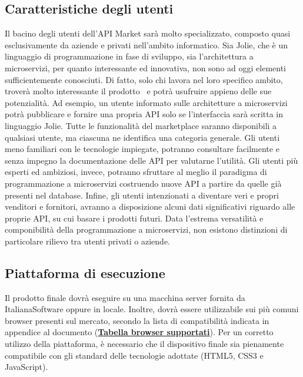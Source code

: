 \subsection{Caratteristiche degli utenti}
Il bacino degli utenti dell'API Market sarà molto specializzato, composto quasi esclusivamente da aziende e privati nell'ambito informatico. Sia Jolie, che è un linguaggio di programmazione in fase di sviluppo, sia l'architettura a microservizi, per quanto interessante ed innovativa, non sono ad oggi elementi sufficientemente conosciuti. Di fatto, solo chi lavora nel loro specifico ambito, troverà molto interessante il prodotto \progetto\ e potrà usufruire appieno delle sue potenzialità. Ad esempio, un utente informato sulle architetture a microservizi potrà pubblicare e fornire una propria API solo se l'interfaccia sarà scritta in linguaggio Jolie. Tutte le funzionalità del marketplace saranno disponibili a qualsiasi utente, ma ciascuna ne identifica una categoria generale. Gli utenti meno familiari con le tecnologie impiegate, potranno consultare facilmente e senza impegno la documentazione delle API per valutarne l'utilità. Gli utenti più esperti ed ambiziosi, invece, potranno sfruttare al meglio il paradigma di programmazione a microservizi costruendo nuove API a partire da quelle già presenti nel database. Infine, gli utenti intenzionati a diventare veri e propri venditori e fornitori, avranno a disposizione alcuni dati significativi riguardo alle proprie API, su cui basare i prodotti futuri. Data l'estrema versatilità e componibilità della programmazione a microservizi, non esistono distinzioni di particolare rilievo tra utenti privati o aziende.

\subsection{Piattaforma di esecuzione}
Il prodotto finale dovrà eseguire su una macchina server fornita da ItalianaSoftware oppure in locale. Inoltre, dovrà essere utilizzabile sui più comuni browser presenti sul mercato, secondo la lista di compatibilità indicata in appendice al documento (\textbf{\hyperref[Tabella-browser-supportati]{Tabella browser supportati}}). Per un corretto utilizzo della piattaforma, è necessario che il dispositivo finale sia pienamente compatibile con gli standard delle tecnologie adottate (HTML5, CSS3 e JavaScript).

